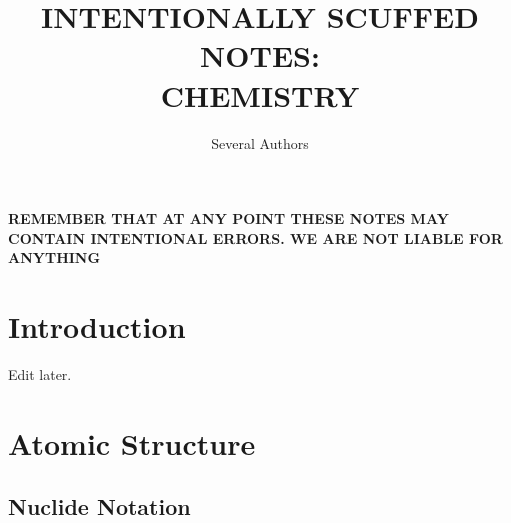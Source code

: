 \documentclass[a4paper]{article}
\theoremstyle{definition}
\newcommand{\sectionSpace}{\vspace{1em}} %
\begin{document}
\title{INTENTIONALLY SCUFFED NOTES:\\ CHEMISTRY}
\author{Several Authors}
\maketitle
\newpage



\begin{center}
    \Large 
    \textbf{
        REMEMBER THAT AT ANY POINT THESE NOTES MAY CONTAIN INTENTIONAL ERRORS. WE ARE NOT LIABLE FOR ANYTHING} 
\end{center}

\sectionSpace
\section{Introduction}
    Edit later.


\sectionSpace
\section{Atomic Structure}
    \subsection{Nuclide Notation}
    
\end{document}
